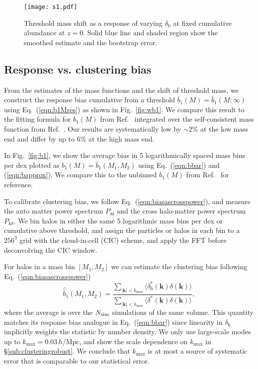 \documentclass[prd,twocolumn,amsmath,amssymb,floatfix,superscriptaddress]{revtex4-1}
\newcommand{\br}{\textrm{b}}
\begin{document}
\begin{figure}[tb]
    \centering
    \texttt{[image: s1.pdf]}
    \caption{\footnotesize 
        Threshold mass shift {as a response of varying} $\delta_\br$ at fixed cumulative abundance at $z=0$.
         Solid blue line and shaded region show the smoothed estimate
        and the bootstrap error.
    }
    \label{fig:shift}
\end{figure}





\subsection{Response vs. clustering bias}
\label{sub:comp}

From  the estimates  of the mass functions and the shift of threshold mass,
we construct the response bias
cumulative from a threshold $\bar b_1(M)= \bar b_1(M;\infty)$ using Eq.~(\ref{eqn:b1Mres})
as shown in Fig.~\ref{fig:wb1}.   We compare this result to the fitting formula
for $b_1(M)$ from Ref.~\cite{Tinkeretal:10} integrated over the self-consistent
mass function from Ref.~\cite{TinkerKravEtAl08}.  Our results are systematically low
by $\sim 2\%$ at the low mass end and differ by up to $6\%$ at the high mass end.


In Fig.~\ref{fig:b1}, we show the average bias in 5 logarithmically spaced mass bins
per dex  plotted as $b_1(M) = \bar b_1(M_1,M_2)$ using Eq.~(\ref{eqn:bbar}) and (\ref{eqn:bapprox}).  We compare this to the unbinned $b_1(M)$ from Ref.~\cite{Tinkeretal:10} 
for reference.

To calibrate clustering bias, we follow Eq.~(\ref{eqn:biasascrosspower}),
and measure the auto matter power spectrum $P_{\delta\delta}$
and the cross halo-matter power spectrum $P_{\textrm{h}\delta}$.
We bin halos in either the same 5 logarithmic mass bins per dex or cumulative above threshold, and
assign the particles or halos in each bin to a $256^3$ grid
with the cloud-in-cell (CIC) scheme, and apply the FFT
before deconvolving the CIC window.


For halos in a mass bin $[M_1, M_2]$ 
we can estimate the clustering bias following Eq.~(\ref{eqn:biasascrosspower})
\begin{equation}
    \hat{\bar b}_1(M_1, M_2) =\frac{
    \sum_{|\mathbf{k}|<k_\textrm{max}}\langle \delta_\textrm{h}^\ast(\mathbf{k})\delta(\mathbf{k}) \rangle}{
    {\sum_{|\mathbf{k}|<k_\textrm{max}} \langle \delta^\ast(\mathbf{k})\delta(\mathbf{k})}\rangle},
    \label{eqn:cross_est}
\end{equation}
where the average is over the $N_{\rm sim}$ simulations of the same volume.
This quantity matches its response bias analogue in Eq.~(\ref{eqn:bbar}) since linearity in
$\delta_\textrm{h}$ implicitly weights the statistic by number density.
We only use large-scale modes up to $k_\textrm{max} = 0.03\,h/\textrm{Mpc}$,
and show the scale dependence on $k_\textrm{max}$ in \S\ref{sub:clusteringrobust}. {We conclude
that $k_\textrm{max}$ is at most a source of systematic error that is comparable to our
statistical error.}
\end{document}
